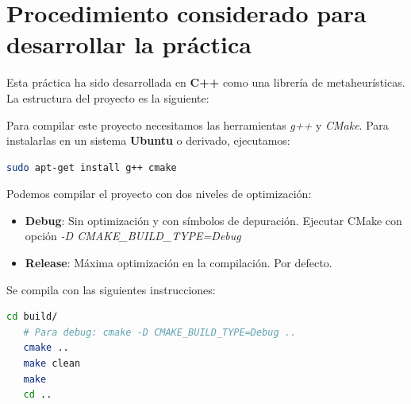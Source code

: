 \documentclass[a4paper, 12pt]{article}
\begin{document}
      
      \newpage
      \section{Procedimiento considerado para desarrollar la práctica}
      Esta práctica ha sido desarrollada en \textbf{C++} como una librería de metaheurísticas. La estructura del proyecto es la siguiente:\\
      
      \vspace*{0.5cm}
      
      Para compilar este proyecto necesitamos las herramientas \textit{g++} y \textit{CMake}. Para instalarlas en un sistema \textbf{Ubuntu} o derivado, ejecutamos:
      
      \begin{lstlisting}[language=bash]
      sudo apt-get install g++ cmake 
      \end{lstlisting}
      
      Podemos compilar el proyecto con dos niveles de optimización:
      \begin{itemize}
         \item \textbf{Debug}: Sin optimización y con símbolos de depuración. Ejecutar CMake con opción \textit{-D CMAKE\_BUILD\_TYPE=Debug}
         
         \item \textbf{Release}: Máxima optimización en la compilación. Por defecto.
      \end{itemize}
      
      Se compila con las siguientes instrucciones:
      
      \begin{lstlisting}[language=bash]
   cd build/
   # Para debug: cmake -D CMAKE_BUILD_TYPE=Debug ..
   cmake ..  
   make clean
   make
   cd ..
      \end{lstlisting}
      
\end{document}
